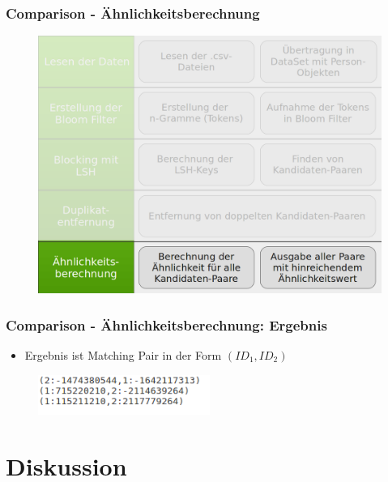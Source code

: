 \documentclass{beamer}
\begin{document}
    \begin{frame}
    		\frametitle{Comparison - Ähnlichkeitsberechnung}
    		\begin{figure}[H]
    			\includegraphics[width=\textwidth]{graphics/process_5.png}
    		\end{figure}
    \end{frame}
    
    \begin{frame}
    		\frametitle{Comparison - Ähnlichkeitsberechnung: Ergebnis}
    		\begin{itemize}
    			\item Ergebnis ist Matching Pair in der Form $(ID_1, ID_2)$
    		\end{itemize}
    		\begin{figure}[H]
    			\includegraphics[width=0.5\textwidth]{graphics/endresult.png}
    		\end{figure}
    \end{frame}
    
    \section[Section]{Diskussion}
    
\end{document}

